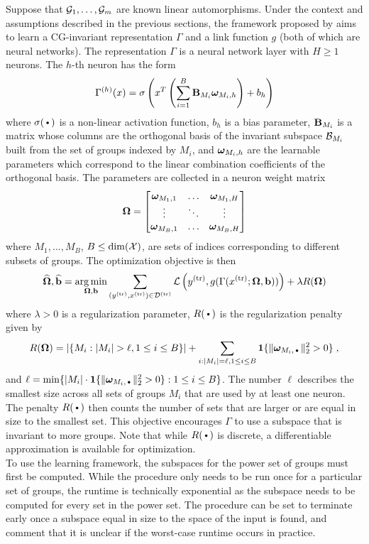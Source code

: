 Suppose that $\mathcal{G}_1,\ldots,\mathcal{G}_m$ are known linear automorphisms. Under the context and assumptions described in the previous sections, the framework proposed by \textcite{Mouli:2021} aims to learn a CG-invariant representation $\Gamma$ and a link function $g$ (both of which are neural networks). The representation $\Gamma$ is a neural network layer with $H\geq1$ neurons. The $h$-th neuron has the form
\[
\Gamma^{(h)}(x) = \sigma\left(x^T\left(\sum_{i=1}^B\mathbf{B}_{M_i}\bm{\omega}_{M_i,h}\right)+b_h\right)
\]
where $\sigma(\argdot)$ is a non-linear activation function, $b_h$ is a bias parameter, $\mathbf{B}_{M_i}$ is a matrix whose columns are the orthogonal basis of the invariant subspace $\mathcal{B}_{M_i}$ built from the set of groups indexed by $M_i$, and $\bm{\omega}_{M_i,h}$ are the learnable parameters which correspond to the linear combination coefficients of the orthogonal basis. The parameters are collected in a neuron weight matrix
\[
\bm{\Omega} =
\begin{bmatrix}
\bm{\omega}_{M_1,1} & \ldots & \bm{\omega}_{M_1,H} \\
\vdots & \ddots & \vdots \\
\bm{\omega}_{M_B,1} & \ldots & \bm{\omega}_{M_B,H}
\end{bmatrix}
\]
where $M_1,\ldots,M_B$, $B\leq \mathrm{dim}(\mathcal{X})$, are sets of indices corresponding to different subsets of groups. The optimization objective is then
\[
\widehat{\bm{\Omega}},\widehat{\mathbf{b}} = \operatorname*{arg\,min}_{\bm{\Omega},\mathbf{b}}\sum_{(y^\text{(tr)},x^\text{(tr)})\in\mathcal{D}^\text{(tr)}}\mathcal{L}\left(y^\text{(tr)},g(\Gamma(x^\text{(tr)};\bm{\Omega},\mathbf{b}))\right)+ \lambda R(\bm{\Omega})
\]
where $\lambda>0$ is a regularization parameter, $R(\argdot)$ is the regularization penalty given by
\[
R(\bfOm) = \left|\{M_i:|M_i|>\ell, 1\leq i\leq B\}\right| + \sum_{i:|M_i|=\ell,1\leq i\leq B}\onevec\{\|\bfom_{M_i,\argdot}\|_2^2>0\}\;,
\]
and $\ell = \min\{|M_i|\cdot\onevec\{\|\bfom_{M_i,\argdot}\|_2^2>0\}: 1\leq i \leq B\}$. The number $\ell$ describes the smallest size across all sets of groups $M_i$ that are used by at least one neuron. The penalty $R(\argdot)$ then counts the number of sets that are larger or are equal in size to the smallest set. This objective encourages $\Gamma$ to use a subspace that is invariant to more groups. Note that while $R(\argdot)$ is discrete, a differentiable approximation is available for optimization.
\\

To use the learning framework, the subspaces for the power set of groups must first be computed. While the procedure only needs to be run once for a particular set of groups, the runtime is technically exponential as the subspace needs to be computed for every set in the power set. The procedure can be set to terminate early once a subspace equal in size to the space of the input is found, and \citeauthor{Mouli:2021} comment that it is unclear if the worst-case runtime occurs in practice.

